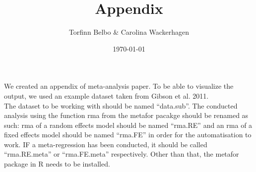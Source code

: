 \documentclass[11pt, a4paper]{article}
\begin{document}



\title{Appendix}
\author{Torfinn Belbo \& Carolina Wackerhagen}

\date{\today}

\maketitle

We created an appendix of meta-analysis paper. To be able to visualize the output, we used an example dataset taken from Gibson et al. 2011.\\ 

The dataset to be working with should be named ``data.sub''. The conducted analysis using the function rma from the metafor pacakge should be renamed as such: rma of a random effects model should be named ``rma.RE'' and an rma of a fixed effects model should be named ``rma.FE'' in order for the automatisation to work. IF a meta-regression has been conducted, it should be called ``rma.RE.meta'' or ``rma.FE.meta'' respectively. Other than that, the metafor package in R needs to be installed.  
\end{document}

